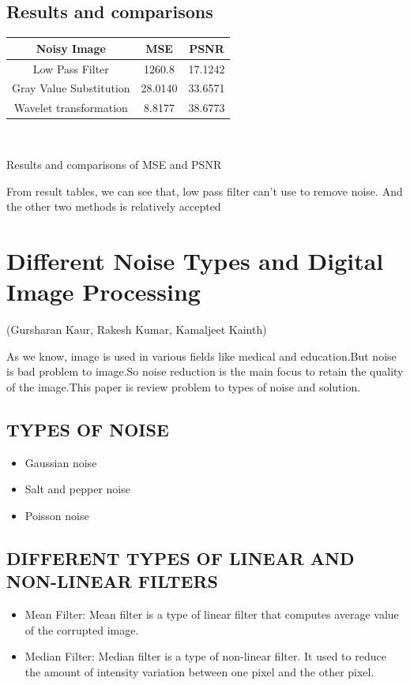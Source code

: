 \subsection{Results and comparisons }
\vspace{1cm}

\begin{center}


\begin{tabular}{|c|c|c|}
\hline 
Noisy Image  & MSE & PSNR \\ 
\hline 
Low Pass Filter  & 1260.8 & 17.1242  \\ 
\hline 
Gray Value Substitution & 28.0140 & 33.6571  \\ 
\hline 
Wavelet transformation  & 8.8177  & 38.6773  \\ 
\hline 
\end{tabular} 

\

Results and comparisons of MSE and PSNR 
\end{center}

From result tables, we can see that, low pass filter can't use to remove noise. And the other two methods is relatively accepted

\section{Different Noise Types and Digital Image Processing}
(Gursharan Kaur, Rakesh Kumar, Kamaljeet Kainth)


As we know, image is used in various fields like medical and education.But noise is bad problem to image.So noise reduction is the main focus to retain the quality of the image.This paper is review problem to types of noise and solution.

\subsection{TYPES OF NOISE}
\begin{itemize}
\item Gaussian noise
\item Salt and pepper noise
\item Poisson noise
\end{itemize}

\subsection{DIFFERENT TYPES OF LINEAR AND NON-LINEAR FILTERS}
\begin{itemize}
\item Mean Filter: Mean filter is a type of linear filter that computes average value of the corrupted image.
\item Median Filter: Median filter is a type of non-linear filter. It used to reduce the amount of intensity variation between one pixel and the other pixel.
\end{itemize}

